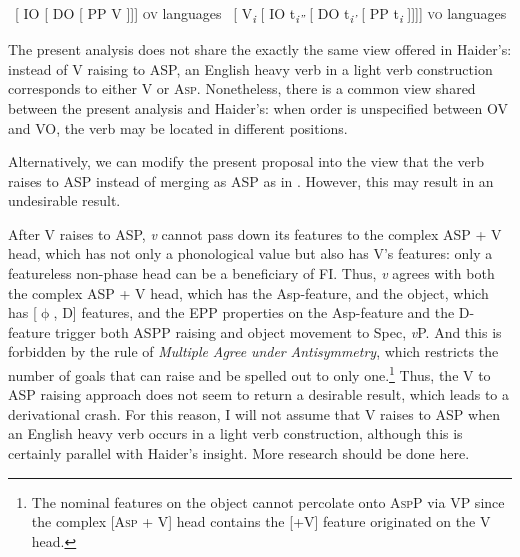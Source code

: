 \ea\label{ex:126}
    \ea  ~[ IO [ DO [ PP V ]]] \hfill \textsc{ov} languages
    \ex ~[ V\textit{\textsubscript{i}} [ IO t\textit{\textsubscript{i''}} [ DO t\textit{\textsubscript{i'}} [ PP t\textit{\textsubscript{i}} ]]]] \hfill \textsc{vo} languages
    \z
\z

The present analysis does not share the exactly the same view offered in Hai\-der's: instead of V raising to \ac{ASP}, an English heavy verb in a light verb construction corresponds to either V or A\textsc{sp.} Nonetheless, there is a common view shared between the present analysis and Haider’s: when order is unspecified between \ac{OV} and \ac{VO}, the verb may be located in different positions.

Alternatively, we can modify the present proposal into the view that the verb raises to \ac{ASP} instead of merging as \ac{ASP} as in . However, this may result in an undesirable result.

\ea\label{ex:127}
\z
After V raises to \ac{ASP}, \textit{v} cannot pass down its features to the complex \ac{ASP} + V head, which has not only a phonological value but also has V’s features: only a featureless non-phase head can be a beneficiary of \ac{FI}. Thus, \textit{v} agrees with both the complex \ac{ASP} + V head, which has the Asp-feature, and the object, which has [${\upphi}$, D] features, and the \ac{EPP} properties on the Asp-feature and the D-feature trigger both \ac{ASP}P raising and object movement to Spec, \textit{v}P. And this is forbidden by the rule of \textit{Multiple} \textit{Agree} \textit{under} \textit{Antisymmetry}, which restricts the number of goals that can raise and be spelled out to only one.\footnote{\textrm{The nominal features on the object cannot percolate onto A}\textrm{\textsc{sp}}\textrm{P via \acs{VP} since the complex [A}\textrm{\textsc{sp}} \textrm{+ V] head contains the [+V] feature originated on the V head.}} Thus, the V to \ac{ASP} raising approach does not seem to return a desirable result, which leads to a derivational crash. For this reason, I will not assume that V raises to \ac{ASP} when an English heavy verb occurs in a light verb construction, although this is certainly parallel with Haider’s insight. More research should be done here.


